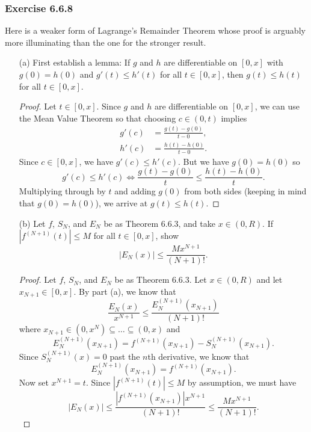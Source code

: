 \subsubsection{Exercise 6.6.8} Here is a weaker form of Lagrange's Remainder Theorem whose proof is arguably more illuminating than the one for the stronger result.
\begin{enumerate}
    \item[(a)] First establish a lemma: If \( g  \) and \( h  \) are differentiable on \( [0,x] \) with \( g(0) = h(0)  \) and \( g'(t) \leq h'(t) \) for all \( t \in [0,x] \), then \( g(t) \leq h(t)  \) for all \( t \in [0,x]  \).
        \begin{proof}
            Let \( t \in [0,x] \). Since \( g \) and \( h  \) are differentiable on \( [0,x] \), we can use the Mean Value Theorem so that choosing \( c \in (0,t) \) implies 
            \begin{align*}
                g'(c)  &= \frac{ g(t) - g(0) }{ t - 0  },   \\
                h'(c) &= \frac{ h(t) - h(0)  }{ t - 0 }.
            \end{align*}
            Since \( c \in [0,x]  \), we have \( g'(c) \leq h'(c)  \). But we have \( g(0) = h(0) \) so 
            \[  g'(c) \leq h'(c) \iff \frac{ g(t) - g(0)  }{ t  } \leq \frac{ h(t) - h(0)  }{ t  } . \]
            Multiplying through by \( t  \) and adding \( g(0)  \) from both sides (keeping in mind that \( g(0) = h(0) \)), we arrive at \( g(t) \leq h(t) \).
        \end{proof}
    \item[(b)] Let \( f  \), \( S_N  \), and \( E_N  \) be as Theorem 6.6.3, and take \( x \in (0,R ) \). If \( | f^{(N+1)}(t) | \leq M  \) for all \( t \in [0,x ] \), show 
        \[  | E_{N}(x) | \leq \frac{ M x^{N+1} }{ (N+1)! }. \]
        \begin{proof}
            Let \( f  \), \( S_{N} \), and \( E_{N} \) be as Theorem 6.6.3. Let \( x \in (0,R ) \) and let \( x_{N+1} \in [0,x] \). By part (a), we know that 
        \[  \frac{ E_N(x) }{ x^{N+1} } \leq \frac{ E_{N}^{(N+1)}(x_{N+1}) }{ (N+1)! }  \]
        where \( x_{N+1} \in (0, x^{N}) \subseteq \dots \subseteq (0,x)  \) and 
        \[  E_{N}^{(N+1)}(x_{N+1}) = f^{(N+1)}(x_{N+1}) - S_{N}^{(N+1)}(x_{N+1}). \]
        Since \( S_{N}^{(N+1)}(x) = 0  \) past the \( n \)th derivative, we know that 
        \[  E_{N}^{(N+1)}(x_{N+1}) = f^{(N+1)}(x_{N+1}). \] Now set \( x^{N+1} = t  \). Since \( | f^{(N+1)}(t) | \leq M  \) by assumption, we must have
        \[  | E_N(x)  | \leq \frac{ | f^{(N+1)}(x_{N+1}) | x^{N+1} }{ (N+1)! }  \leq \frac{ M x^{N+1} }{ (N+1)! }.\]
        \end{proof}
\end{enumerate}











